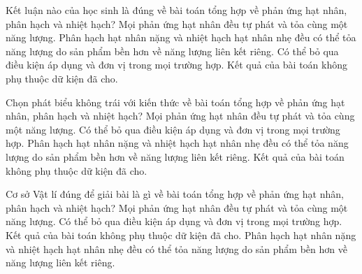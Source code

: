 \begin{ex}
Kết luận nào của học sinh là đúng về bài toán tổng hợp về phản ứng hạt nhân, phân hạch và nhiệt hạch?
\choice
{Mọi phản ứng hạt nhân đều tự phát và tỏa cùng một năng lượng.}
{\True Phân hạch hạt nhân nặng và nhiệt hạch hạt nhân nhẹ đều có thể tỏa năng lượng do sản phẩm bền hơn về năng lượng liên kết riêng.}
{Có thể bỏ qua điều kiện áp dụng và đơn vị trong mọi trường hợp.}
{Kết quả của bài toán không phụ thuộc dữ kiện đã cho.}
\end{ex}

\begin{ex}
Chọn phát biểu không trái với kiến thức về bài toán tổng hợp về phản ứng hạt nhân, phân hạch và nhiệt hạch?
\choice
{Mọi phản ứng hạt nhân đều tự phát và tỏa cùng một năng lượng.}
{Có thể bỏ qua điều kiện áp dụng và đơn vị trong mọi trường hợp.}
{\True Phân hạch hạt nhân nặng và nhiệt hạch hạt nhân nhẹ đều có thể tỏa năng lượng do sản phẩm bền hơn về năng lượng liên kết riêng.}
{Kết quả của bài toán không phụ thuộc dữ kiện đã cho.}
\end{ex}

\begin{ex}
Cơ sở Vật lí đúng để giải bài là gì về bài toán tổng hợp về phản ứng hạt nhân, phân hạch và nhiệt hạch?
\choice
{Mọi phản ứng hạt nhân đều tự phát và tỏa cùng một năng lượng.}
{Có thể bỏ qua điều kiện áp dụng và đơn vị trong mọi trường hợp.}
{Kết quả của bài toán không phụ thuộc dữ kiện đã cho.}
{\True Phân hạch hạt nhân nặng và nhiệt hạch hạt nhân nhẹ đều có thể tỏa năng lượng do sản phẩm bền hơn về năng lượng liên kết riêng.}
\end{ex}

